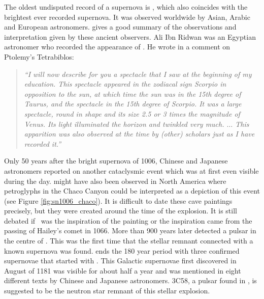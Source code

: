 The oldest undisputed record of a supernova is , which also coincides with the brightest ever recorded supernova.  It was observed worldwide by Asian, Arabic and European astronomers. \citet{1965AJ.....70..105G} gives a good summary of the observations and interpretation given by these ancient observers. Ali Ibn Ridwan was an Egyptian astronomer who recorded the appearance of . He wrote in a comment on Ptolemy's Tetrabiblos: 
\begin{quote}
\textit{``I will now describe for you a spectacle that I saw at the beginning of my education. This spectacle appeared in the zodiacal sign Scorpio in opposition to the sun, at which time the sun was in the 15th degree of Taurus, and the spectacle in the 15th degree of Scorpio. It was a large spectacle, round in shape and its size 2.5 or 3 times the magnitude of Venus. Its light illuminated the horizon and twinkled very much. $\dots$ This apparition was also observed at the time by (other) scholars just as I have recorded it.''}
\end{quote}

Only 50 years after the bright supernova of 1006, Chinese and Japanese astronomers reported on another cataclysmic event which was at first even visible during the day.   might have also been observed in North America where petroglyphs in the Chaco Canyon could be interpreted as a depiction of this event (see Figure \ref{fig:sn1006_chaco}). It is difficult to date  these cave paintings precisely, but they were created around the time of the  explosion. It is still debated if \ was the inspiration of the painting or the inspiration came from the passing of Hailey's comet in 1066. More than 900 years later \citet{1968Sci...162.1481S} detected a pulsar in the centre of . This was the first time that the stellar remnant connected with a known supernova was found.
 ends the 180 year period with three confirmed supernovae that started with . This Galactic supernovae  first discovered in August of 1181 was visible for about half a year and was mentioned in eight different texts by Chinese and Japanese astronomers. 3C58, a pulsar found in , is suggested to be the neutron star remnant of this stellar explosion. 



